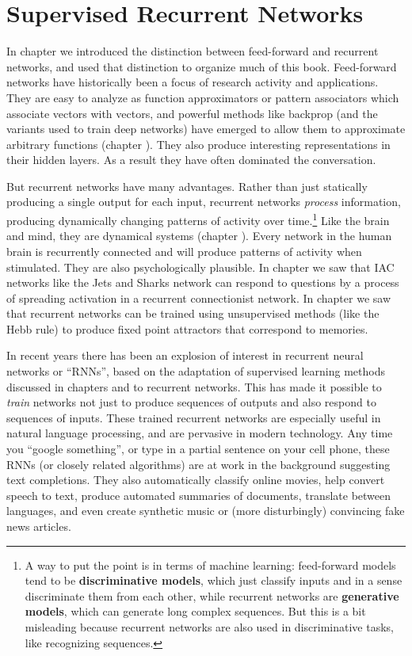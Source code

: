 \chapter{Supervised Recurrent Networks}\label{ch_supervised_recurrent}

In chapter  we introduced the distinction between feed-forward and recurrent networks, and used that distinction to organize much of this book. Feed-forward networks have historically been a focus of research activity and applications. They are easy to analyze as function approximators or pattern associators which  associate vectors with vectors, and powerful methods like backprop (and the variants used to train deep networks) have emerged to allow them to approximate arbitrary functions (chapter ). They also produce interesting representations in their hidden layers. As a  result they have often dominated the conversation.

But recurrent networks have many advantages. Rather than just statically producing a single output for each input, recurrent networks \emph{process} information, producing dynamically changing patterns of activity over time.\footnote{A way to put the point is in terms of machine learning: feed-forward models tend to be \textbf{discriminative models}, which just  classify inputs and in a sense discriminate them from each other, while recurrent networks are \textbf{generative models}, which can generate long complex sequences. But this is a bit misleading because recurrent networks are also used in discriminative tasks, like recognizing sequences.} Like the brain and mind, they are dynamical systems (chapter ). Every network in the human brain is recurrently connected and will produce patterns of activity when stimulated. They are also psychologically plausible. In  chapter  we saw that IAC networks like the Jets and Sharks network can respond to questions by a process of spreading activation in a recurrent connectionist network. In chapter  we saw that recurrent networks can be trained using unsupervised methods (like the Hebb rule) to produce fixed point attractors that correspond to memories. 

In recent years there has been an explosion of interest in recurrent neural networks or ``RNNs'', based on the adaptation of supervised learning methods discussed in chapters  and  to recurrent networks. This has made it possible to \emph{train} networks not just to produce sequences of outputs and also respond to sequences of inputs. These  trained recurrent networks are especially useful in natural language processing, and are pervasive in modern technology. Any time you ``google something'', or type in a partial sentence on your cell phone, these RNNs (or closely related algorithms) are at work in the background suggesting text completions. They also automatically classify online movies, help convert speech to text, produce automated summaries of documents, translate between languages, and even create synthetic music or (more disturbingly) convincing fake news articles. 

